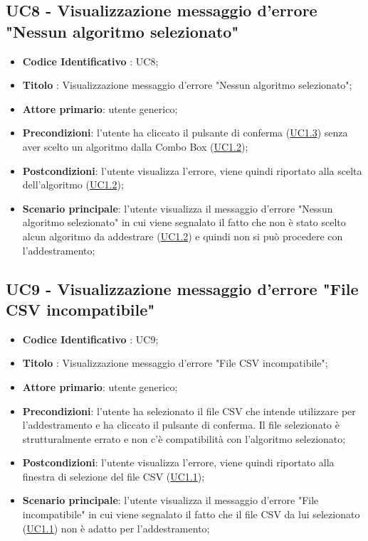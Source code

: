 	\label{par:UC8}
	\subsection{UC8 - Visualizzazione messaggio d'errore "Nessun algoritmo selezionato"}
		\begin{itemize}
			\item\textbf{Codice Identificativo} : UC8;
			\item\textbf{Titolo} : Visualizzazione messaggio d'errore "Nessun algoritmo selezionato";
			\item\textbf{Attore primario}: utente generico;
			\item\textbf{Precondizioni}: l'utente ha cliccato il pulsante di conferma (\hyperref[par:UC1.3]{UC1.3}) senza aver scelto un algoritmo dalla Combo Box (\hyperref[par:UC1.2]{UC1.2});
			\item\textbf{Postcondizioni}: l'utente visualizza l'errore, viene quindi riportato alla scelta dell'algoritmo (\hyperref[par:UC1.2]{UC1.2});
			\item\textbf{Scenario principale}: l'utente visualizza il messaggio d'errore "Nessun algoritmo selezionato" in cui viene segnalato il fatto che non è stato scelto alcun algoritmo da addestrare (\hyperref[par:UC1.2]{UC1.2}) e quindi non si può procedere con l'addestramento; 		
		\end{itemize}
	
	\label{par:UC9}
	\subsection{UC9 - Visualizzazione messaggio d'errore "File CSV incompatibile"}
		\begin{itemize}
			\item\textbf{Codice Identificativo} : UC9;
			\item\textbf{Titolo} : Visualizzazione messaggio d'errore "File CSV incompatibile";
			\item\textbf{Attore primario}: utente generico;
			\item\textbf{Precondizioni}: l'utente ha selezionato il file CSV che intende utilizzare per l'addestramento e ha cliccato il pulsante di conferma. Il file selezionato è strutturalmente errato e non c'è compatibilità con l'algoritmo selezionato;
			\item\textbf{Postcondizioni}: l'utente visualizza l'errore, viene quindi riportato alla finestra di selezione del file CSV (\hyperref[par:UC1.1]{UC1.1});
			\item\textbf{Scenario principale}: l'utente visualizza il messaggio d'errore "File incompatibile" in cui viene segnalato il fatto che il file CSV da lui selezionato (\hyperref[par:UC1.1]{UC1.1}) non è adatto per l'addestramento; 		
		\end{itemize}

